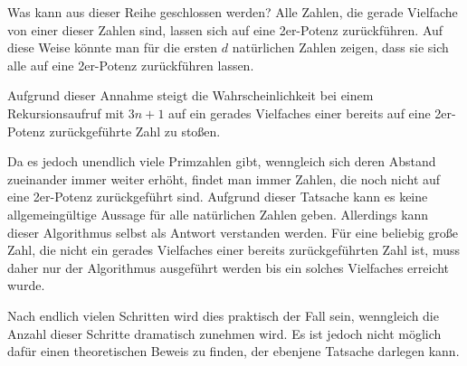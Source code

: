 \documentclass[10pt,a4paper,oneside,ngerman,numbers=noenddot]{scrartcl}
\begin{document}
	Was kann aus dieser Reihe geschlossen werden? Alle Zahlen, die gerade Vielfache von einer dieser Zahlen sind, lassen sich auf eine 2er-Potenz zurückführen. Auf diese Weise könnte man für die ersten $d$ natürlichen Zahlen zeigen, dass sie sich alle auf eine 2er-Potenz zurückführen lassen.
	
	Aufgrund dieser Annahme steigt die Wahrscheinlichkeit bei einem Rekursionsaufruf mit $3n+1$ auf ein gerades Vielfaches einer bereits auf eine 2er-Potenz zurückgeführte Zahl zu stoßen.
	
	Da es jedoch unendlich viele Primzahlen gibt, wenngleich sich deren Abstand zueinander immer weiter erhöht, findet man immer Zahlen, die noch nicht auf eine 2er-Potenz zurückgeführt sind. Aufgrund dieser Tatsache kann es keine allgemeingültige Aussage für alle natürlichen Zahlen geben. Allerdings kann dieser Algorithmus selbst als Antwort verstanden werden. Für eine beliebig große Zahl, die nicht ein gerades Vielfaches einer bereits zurückgeführten Zahl ist, muss daher nur der Algorithmus ausgeführt werden bis ein solches Vielfaches erreicht wurde.
	
	Nach endlich vielen Schritten wird dies praktisch der Fall sein, wenngleich die Anzahl dieser Schritte dramatisch zunehmen wird. Es ist jedoch nicht möglich dafür einen theoretischen Beweis zu finden, der ebenjene Tatsache darlegen kann.
\end{document}
